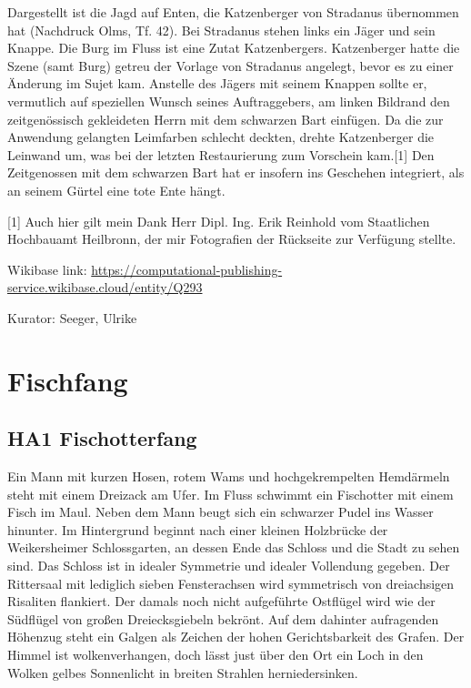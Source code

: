 \documentclass[
  letterpaper,
]{book}
\begin{document}
Dargestellt ist die Jagd auf Enten, die Katzenberger von Stradanus
übernommen hat (Nachdruck Olms, Tf. 42). Bei Stradanus stehen links ein
Jäger und sein Knappe. Die Burg im Fluss ist eine Zutat Katzenbergers.
Katzenberger hatte die Szene (samt Burg) getreu der Vorlage von
Stradanus angelegt, bevor es zu einer Änderung im Sujet kam. Anstelle
des Jägers mit seinem Knappen sollte er, vermutlich auf speziellen
Wunsch seines Auftraggebers, am linken Bildrand den zeitgenössisch
gekleideten Herrn mit dem schwarzen Bart einfügen. Da die zur Anwendung
gelangten Leimfarben schlecht deckten, drehte Katzenberger die Leinwand
um, was bei der letzten Restaurierung zum Vorschein kam.{[}1{]} Den
Zeitgenossen mit dem schwarzen Bart hat er insofern ins Geschehen
integriert, als an seinem Gürtel eine tote Ente hängt.

{[}1{]} Auch hier gilt mein Dank Herr Dipl. Ing. Erik Reinhold vom
Staatlichen Hochbauamt Heilbronn, der mir Fotografien der Rückseite zur
Verfügung stellte.

Wikibase link:
\url{https://computational-publishing-service.wikibase.cloud/entity/Q293}

Kurator: Seeger, Ulrike


\chapter{Fischfang}\label{fischfang}

\section{HA1 Fischotterfang}\label{ha1-fischotterfang}

Ein Mann mit kurzen Hosen, rotem Wams und hochgekrempelten Hemdärmeln
steht mit einem Dreizack am Ufer. Im Fluss schwimmt ein Fischotter mit
einem Fisch im Maul. Neben dem Mann beugt sich ein schwarzer Pudel ins
Wasser hinunter. Im Hintergrund beginnt nach einer kleinen Holzbrücke
der Weikersheimer Schlossgarten, an dessen Ende das Schloss und die
Stadt zu sehen sind. Das Schloss ist in idealer Symmetrie und idealer
Vollendung gegeben. Der Rittersaal mit lediglich sieben Fensterachsen
wird symmetrisch von dreiachsigen Risaliten flankiert. Der damals noch
nicht aufgeführte Ostflügel wird wie der Südflügel von großen
Dreiecksgiebeln bekrönt. Auf dem dahinter aufragenden Höhenzug steht ein
Galgen als Zeichen der hohen Gerichtsbarkeit des Grafen. Der Himmel ist
wolkenverhangen, doch lässt just über den Ort ein Loch in den Wolken
gelbes Sonnenlicht in breiten Strahlen herniedersinken.
\end{document}
